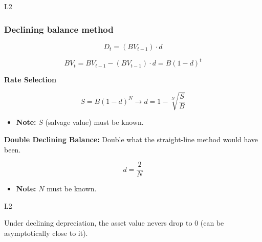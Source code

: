 \begin{example}
    L2
\end{example}

\subsubsection{Declining balance method}
\begin{definition}
    \begin{equation}
        D_t = (BV_{t-1}) \cdot d            
    \end{equation}

    \begin{equation}
        BV_t = BV_{t-1} - (BV_{t-1}) \cdot d = B(1 - d)^t
    \end{equation}

    \textbf{Rate Selection}

    \begin{equation}
        S = B(1 - d)^N \rightarrow d = 1 - \sqrt[N]{\frac{S}{B}}
    \end{equation}
    \begin{itemize}
        \item \textbf{Note:} $S$ (salvage value) must be known.
    \end{itemize}

    \textbf{Double Declining Balance:}
    Double what the straight-line method would have been. 

    \begin{equation}
        d = \frac{2}{N}
    \end{equation}
    \begin{itemize}
        \item \textbf{Note:} $N$ must be known. 
    \end{itemize}
\end{definition}

\begin{example}
    L2
\end{example}

\begin{warning}
    Under declining depreciation, the asset value nevers drop to $0$ (can be asymptotically close to it).
\end{warning}

